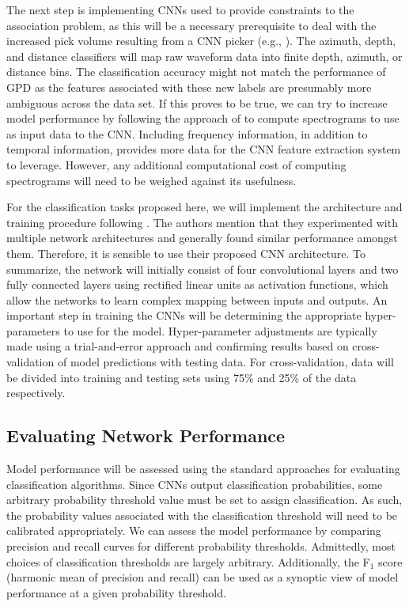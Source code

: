 \documentclass[12p]{article}
\begin{document}
The next step is implementing CNNs used to provide constraints to the association problem, as this will be a
necessary prerequisite to deal with the increased pick volume resulting from a CNN picker (e.g., \citep{Perol2018}). The
azimuth, depth, and distance classifiers will map raw waveform data into finite depth, azimuth, or distance bins. The
classification accuracy might not match the performance of GPD as the features associated with these new labels are
presumably more ambiguous across the data set. If this proves to be true, we can try to increase model performance by
following the approach of \citet{Zhu2019b} to compute spectrograms to use as input data to the CNN. Including frequency
information, in addition to temporal information, provides more data for the CNN feature extraction system to leverage.
However, any additional computational cost of computing spectrograms will need to be weighed against its usefulness.

For the classification tasks proposed here, we will implement the architecture and training procedure following
\citet{Ross2018b}. The authors mention that they experimented with multiple network architectures and generally
found similar performance amongst them. Therefore, it is sensible to use their proposed CNN architecture. To
summarize, the network will initially consist of four convolutional layers and two fully connected layers using
rectified linear units as activation functions, which allow the networks to learn complex mapping between inputs and
outputs. An important step in training the CNNs will be determining the appropriate hyper-parameters to use for the
model. Hyper-parameter adjustments are typically made using a trial-and-error approach and confirming results based on
cross-validation of model predictions with testing data. For cross-validation, data will be divided into training and
testing sets using 75\% and 25\% of the data respectively.

\subsection{Evaluating Network Performance} \label{sec:net_perf}

Model performance will be assessed using the standard approaches for evaluating classification algorithms. Since CNNs
output classification probabilities, some arbitrary probability threshold value must be set to assign classification. As
such, the probability values associated with the classification threshold will need to be calibrated appropriately. We
can assess the model performance by comparing precision and recall curves for different probability thresholds.
Admittedly, most choices of classification thresholds are largely arbitrary. Additionally, the F$_1$ score (harmonic
mean of precision and recall) can be used as a synoptic view of model performance at a given probability threshold.
\end{document}
